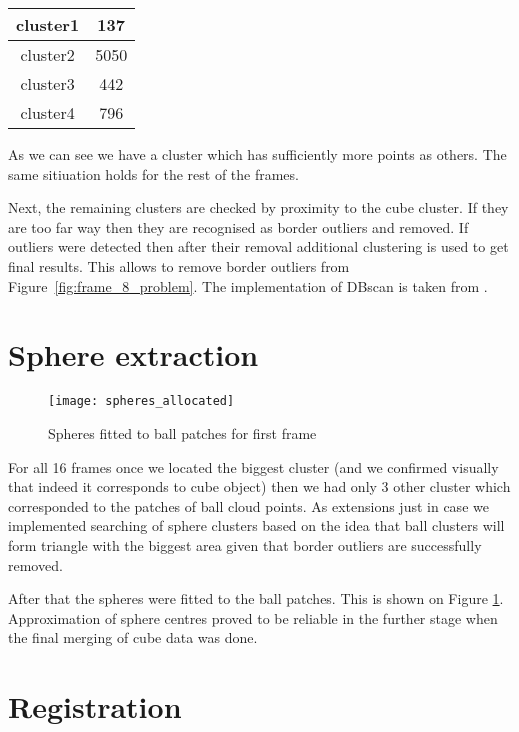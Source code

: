 \documentclass[a4paper,11pt]{article}
\theoremstyle{mytheor}
\begin{document}
 
\begin{center}
    \begin{tabular}{ |c|c|} 
        \hline
         cluster1 & 137 \\
         \hline
         cluster2 & 5050 \\
         \hline
         cluster3 & 442 \\
         \hline
         cluster4 & 796 \\
         \hline
        \end{tabular}
\end{center}

As we can see we have a cluster which has sufficiently more points as others. The same sitiuation holds for the rest of the frames.

Next, the remaining clusters are checked by proximity to the cube cluster. If they are too far way then they are recognised as border outliers and removed. If outliers were detected then after their removal additional clustering is used to get final results. This allows to remove border outliers from Figure~\ref{fig:frame_8_problem}. The implementation of DBscan is taken from \cite{dbscan}.

\section{Sphere extraction}

\begin{figure}[htbp!]
    \centering
    \texttt{[image: spheres\_allocated]}
    \caption{Spheres fitted to ball patches for first frame}
    \label{fig:spheres_allocated}
\end{figure}

For all 16 frames once we located the biggest cluster (and we confirmed visually that indeed it corresponds to cube object) then we had only 3 other cluster which corresponded to the patches of ball cloud points. As extensions just in case we implemented searching of sphere clusters based on the idea that ball clusters will form triangle with the biggest area given that border outliers are successfully removed.

After that the spheres were fitted to the ball patches. This is shown on Figure \ref{fig:spheres_allocated}. Approximation of sphere centres proved to be reliable in the further stage when the final merging of cube data was done.

\section{Registration}
\end{document}
